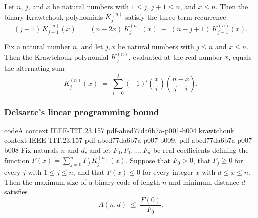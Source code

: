 \begin{theorem}
\label{krawtchouk_recurrence}
\leanok
{}
Let $n$, $j$, and $x$ be natural numbers with $1 \le j$, $j + 1 \le n$, and $x \le n$.
Then the binary Krawtchouk polynomials $K_j^{(n)}$ satisfy the three-term recurrence
\[
(j+1)\,K_{j+1}^{(n)}(x) \;=\; (n - 2x)\,K_j^{(n)}(x) \;-\; (n - j +
1)\,K_{j-1}^{(n)}(x).
\]
\end{theorem}

\begin{theorem}
\label{krawtchoukPoly_eval_nat}
\leanok
{}
Fix a natural number $n$, and let $j, x$ be natural numbers with $j \le n$ and $x \le
n$. Then the Krawtchouk polynomial $K_j^{(n)}$, evaluated at the real number $x$, equals
the alternating sum
\[
  K_j^{(n)}(x) \;=\; \sum_{i=0}^{j} (-1)^i \binom{x}{i}\binom{n-x}{j-i}.
\]
\end{theorem}

\subsubsection{Delsarte's linear programming bound}

\begin{theorem}
\label{delsarte_lp_bound}
\proofstep
  {codeA}
  {context}
  {IEEE-TIT.23.157}
  {pdf-abed77da6b7a-p001-b004}
\proofstep
  {krawtchouk}
  {context}
  {IEEE-TIT.23.157}
  {pdf-abed77da6b7a-p007-b009,
    pdf-abed77da6b7a-p007-b008}
Fix naturals $n$ and $d$, and let $F_0, F_1, \dots, F_n$ be real coefficients defining
the function $F(x) = \sum_{j=0}^{n} F_j\, K_j^{(n)}(x)$. Suppose that $F_0 > 0$, that
$F_j \ge 0$ for every $j$ with $1 \le j \le n$, and that $F(x) \le 0$ for every integer
$x$ with $d \le x \le n$. Then the maximum size of a binary code of length $n$ and
minimum distance $d$ satisfies
\[
  A(n,d) \;\le\; \frac{F(0)}{F_0}.
\]
\end{theorem}

